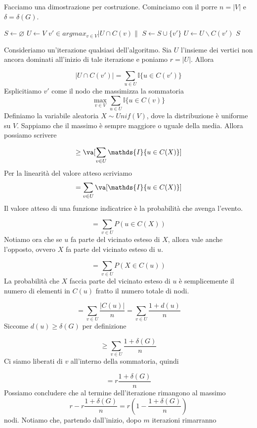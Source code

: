 \documentclass[12pt]{report}
\begin{document}
\begin{dimo}
    Facciamo una dimostrazione per costruzione. Cominciamo con il porre $n = |V|$ e $\delta = \delta(G)$.

\begin{algorithm}[H]
\caption{}\label{euclid}
\begin{algorithmic}[1]
\State $S \gets \varnothing$
\State $U \gets V$
\State $v' \in argmax_{v \in V} |U \cap C(v) \|$ 
\State $S \gets S \cup \{v'\}$
\State $U \gets U \backslash C(v')$
\EndWhile
\State \Return $S$
\end{algorithmic}
\end{algorithm}

\noindent 
Consideriamo un'iterazione qualsiasi dell'algoritmo. Sia $U$ l'insieme dei vertici non ancora dominati all'inizio di tale iterazione e poniamo $r = |U|$. Allora 

$$|U \cap C(v')|  = \sum_{u \in U} \mathds{I}\{u \in C(v')\}$$Esplicitiamo $v'$ come il nodo che massimizza la sommatoria
$$\max_{v \in V} \sum_{u \in U} \mathds{I}\{u \in C(v)\}$$ Definiamo la variabile aleatoria $X \sim Unif(V)$, dove la distribuzione è uniforme su $V$. Sappiamo che il massimo è sempre maggiore o uguale della media. Allora possiamo scrivere

$$\geq \va[\sum_{v \in U} \mathds{I}\{u \in C(X)\}]$$Per la linearità del valore atteso scriviamo
$$= \sum_{v \in U}  \va[\mathds{I}\{u \in C(X)\}]$$
Il valore atteso di una funzione indicatrice è la probabilità che avenga l'evento. 

$$= \sum_{v \in U} P(u \in C(X))$$
Notiamo ora che se $u$ fa parte del vicinato esteso di $X$, allora vale anche l'opposto, ovvero $X$ fa parte del vicinato esteso di $u$.

$$= \sum_{v \in U} P(X \in C(u))$$
La probabilità che $X$ faccia parte del vicinato esteso di $u$ è semplicemente il numero di elementi in $C(u)$ fratto il numero totale di nodi.

$$= \sum_{v \in U} \frac{|C(u)|}{n} = \sum_{v \in U} \frac{1 + d(u)}{n} $$
Siccome $d(u) \geq \delta(G)$ per definizione

$$\geq \sum_{v \in U} \frac{1 + \delta(G)}{n}$$ Ci siamo liberati di $v$ all'interno della sommatoria, quindi

$$= r \frac{1 + \delta(G)}{n}$$
Possiamo concludere che al termine dell'iterazione rimangono al massimo $$r - r\frac{1+\delta(G)}{n} = r(1- \frac{1 + \delta(G)}{n})$$ nodi. Notiamo che, partendo dall'inizio, dopo $m$ iterazioni rimarranno


\end{dimo}
\end{document}
